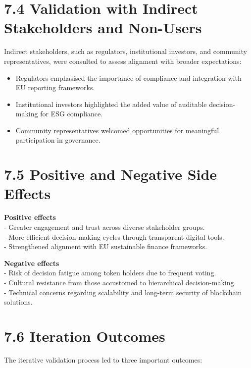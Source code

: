 \documentclass[
  english,
  12pt,
  oneside,
  open=any]{scrbook}
\providecommand{\tightlist}{%
  \setlength{\itemsep}{0pt}\setlength{\parskip}{0pt}}\usepackage{longtable,booktabs,array}
\begin{document}
\section{7.4 Validation with Indirect Stakeholders and
Non-Users}\label{sec-indirect}

Indirect stakeholders, such as regulators, institutional investors, and
community representatives, were consulted to assess alignment with
broader expectations:

\begin{itemize}
\tightlist
\item
  Regulators emphasised the importance of compliance and integration
  with EU reporting frameworks.\\
\item
  Institutional investors highlighted the added value of auditable
  decision-making for ESG compliance.\\
\item
  Community representatives welcomed opportunities for meaningful
  participation in governance.
\end{itemize}

\section{7.5 Positive and Negative Side Effects}\label{sec-effects}

\textbf{Positive effects}\\
- Greater engagement and trust across diverse stakeholder groups.\\
- More efficient decision-making cycles through transparent digital
tools.\\
- Strengthened alignment with EU sustainable finance frameworks.

\textbf{Negative effects}\\
- Risk of decision fatigue among token holders due to frequent voting.\\
- Cultural resistance from those accustomed to hierarchical
decision-making.\\
- Technical concerns regarding scalability and long-term security of
blockchain solutions.

\section{7.6 Iteration Outcomes}\label{sec-iterations}

The iterative validation process led to three important outcomes:
\end{document}
